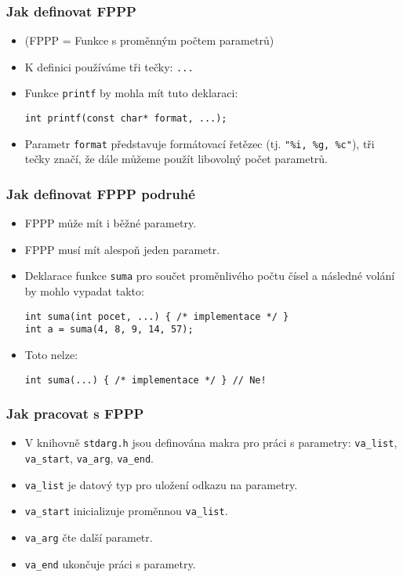 \documentclass{beamer}
\newenvironment{itemizex}%
  {\large \begin{itemize}%
    \setlength{\itemsep}{8pt}%
    \setlength{\parskip}{8pt}}%
  {\end{itemize}}
\begin{document}
\begin{frame}[t,fragile]\frametitle{Jak definovat FPPP} 
    \begin{itemizex}
        \item (FPPP = Funkce s proměnným počtem parametrů)
        \item K definici používáme tři tečky: \texttt{...}
        \item Funkce \texttt{printf} by mohla mít tuto deklaraci:
\begin{verbatim} 
int printf(const char* format, ...);
\end{verbatim}
        \item Parametr \texttt{format} představuje formátovací řetězec (tj. \texttt{"\%i, \%g, \%c"}), tři tečky značí, že dále můžeme použít libovolný počet parametrů. 
    \end{itemizex}
\end{frame}



\begin{frame}[t,fragile]\frametitle{Jak definovat FPPP podruhé} 
    \begin{itemizex}
        \item FPPP může mít i běžné  parametry. 
        \item FPPP musí mít alespoň jeden  parametr. 
        \item Deklarace funkce \texttt{suma} pro součet proměnlivého počtu čísel a následné volání by mohlo vypadat takto:
\begin{verbatim} 
int suma(int pocet, ...) { /* implementace */ }
int a = suma(4, 8, 9, 14, 57);
\end{verbatim}
        \item Toto nelze:
\begin{verbatim} 
int suma(...) { /* implementace */ } // Ne! 
\end{verbatim}
    \end{itemizex}
\end{frame}


\begin{frame}[t,fragile]\frametitle{Jak pracovat s FPPP} 
    \begin{itemizex}
        \item V knihovně \texttt{stdarg.h} jsou definována makra pro práci s parametry: \texttt{va\_list}, \texttt{va\_start}, \texttt{va\_arg}, \texttt{va\_end}.
        \item \texttt{va\_list} je datový typ pro uložení odkazu na parametry. 
        \item \texttt{va\_start} inicializuje proměnnou \texttt{va\_list}.
        \item \texttt{va\_arg} čte další parametr. 
        \item \texttt{va\_end} ukončuje práci s parametry. 
    \end{itemizex}
\end{frame}
\end{document}

